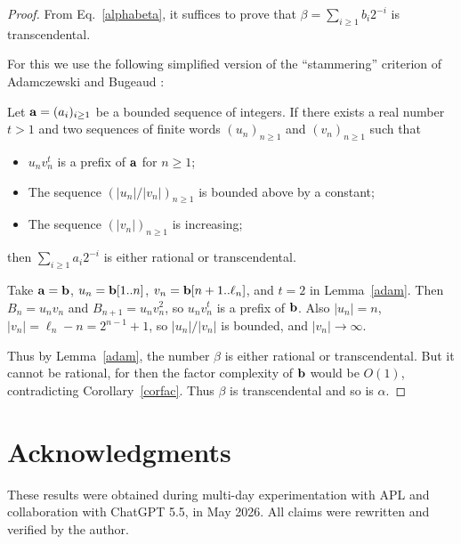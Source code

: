 \documentclass[12pt,reqno]{article}
\begin{document}
\begin{proof}
From Eq.~\eqref{alphabeta}, it suffices to prove that 
$\beta = \sum_{i \geq 1} b_i 2^{-i}$ is transcendental.

For this we use the following simplified version of the
``stammering'' criterion of Adamczewski and Bugeaud
\cite[Thm.~5]{Adamczewski&Bugeaud:2007}:
\begin{lemma}
Let ${\bf a} = (a_i)_{i \geq 1}$ be a bounded sequence of integers.
If there exists a real number $t>1$  and two sequences
of finite words $(u_n)_{n \geq 1}$ and $(v_n)_{n \geq 1}$  such that
\begin{itemize}
\item[(a)] $u_n v_n^t$ is a prefix of $\bf a$ for $n \geq 1$;
\item[(b)] The sequence $(|u_n|/|v_n|)_{n \geq 1}$ is bounded above
by a constant;
\item[(c)] The sequence $(|v_n|)_{n \geq 1}$ is increasing;
\end{itemize}
then $\sum_{i\geq 1} a_i 2^{-i}$ is either rational
or transcendental.
\label{adam}
\end{lemma}

Take ${\bf a} = {\bf b}$, $u_n = {\bf b}[1..n]$,
$v_n = {\bf b}[n+1..\ell_n]$, and $t = 2$ in Lemma~\ref{adam}.
Then $B_n = u_n v_n$ and $B_{n+1} = u_n v_n^2$, so
$u_n v_n^t$ is a prefix of $\bf b$.  Also
$|u_n| = n$, $|v_n| = \ell_n - n = 2^{n-1} + 1$,
so $|u_n|/|v_n|$ is bounded, and $|v_n| \rightarrow \infty$.

Thus by Lemma~\ref{adam}, the number
$\beta$ is either rational or transcendental.
But it cannot be rational, for then the factor complexity
of $\bf b$ would be $O(1)$, contradicting
Corollary~\ref{corfac}.  Thus $\beta$ is transcendental
and so is $\alpha$.
\end{proof}

\section{Acknowledgments}

These results were obtained during multi-day experimentation with  
APL and collaboration with ChatGPT 5.5,
in May 2026.  All claims were rewritten and verified by the author.
\end{document}
